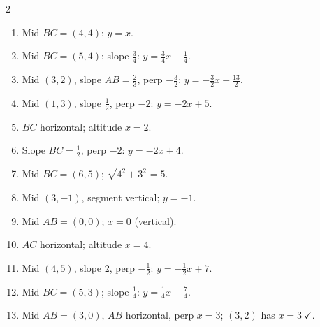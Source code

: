 \documentclass[11pt]{article}
\begin{document}
\begin{keybox}
\begin{multicols}{2}
\small
\begin{enumerate}[leftmargin=*,itemsep=3pt]
  \item Mid $BC=(4,4)$; $y=x$.
  \item Mid $BC=(5,4)$; slope $\tfrac34$: $y=\tfrac34x+\tfrac14$.
  \item Mid $(3,2)$, slope $AB=\tfrac23$, perp $-\tfrac32$: $y=-\tfrac32x+\tfrac{13}{2}$.
  \item Mid $(1,3)$, slope $\tfrac12$, perp $-2$: $y=-2x+5$.
  \item $BC$ horizontal; altitude $x=2$.
  \item Slope $BC=\tfrac12$, perp $-2$: $y=-2x+4$.
  \item Mid $BC=(6,5)$; $\sqrt{4^2+3^2}=5$.
  \item Mid $(3,-1)$, segment vertical; $y=-1$.
  \item Mid $AB=(0,0)$; $x=0$ (vertical).
  \item $AC$ horizontal; altitude $x=4$.
  \item Mid $(4,5)$, slope $2$, perp $-\tfrac12$: $y=-\tfrac12x+7$.
  \item Mid $BC=(5,3)$; slope $\tfrac14$: $y=\tfrac14x+\tfrac74$.
  \item Mid $AB=(3,0)$, $AB$ horizontal, perp $x=3$; $(3,2)$ has $x=3\ \checkmark$.
\end{enumerate}
\end{multicols}
\end{keybox}
\end{document}
